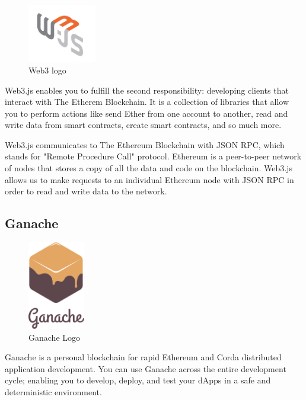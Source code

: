 \begin{figure}
	\vspace{-10pt}
	\includegraphics[width=3cm]{images/chapter3/web3.jpeg}
	\vspace{-10pt}
	\caption{{\footnotesize Web3 logo}}
\end{figure}

Web3.js enables you to fulfill the second responsibility: developing clients that interact with The Etherem Blockchain. It is a collection of libraries that allow you to perform actions like send Ether from one account to another, read and write data from smart contracts, create smart contracts, and so much more.

Web3.js communicates to The Ethereum Blockchain with JSON RPC, which stands for "Remote Procedure Call" protocol. Ethereum is a peer-to-peer network of nodes that stores a copy of all the data and code on the blockchain. Web3.js allows us to make requests to an individual Ethereum node with JSON RPC in order to read and write data to the network\cite{mccubbinIntroWeb3Js}.

\subsection{Ganache}

\begin{figure}
	\vspace{-10pt}
	\includegraphics[width=2.5cm]{images/chapter3/ganache-logo-dark.png}
	\vspace{-10pt}
	\caption{{\footnotesize Ganache Logo}}
\end{figure}

Ganache is a personal blockchain for rapid Ethereum and Corda distributed application development. You can use Ganache across the entire development cycle; enabling you to develop, deploy, and test your dApps in a safe and deterministic environment.


